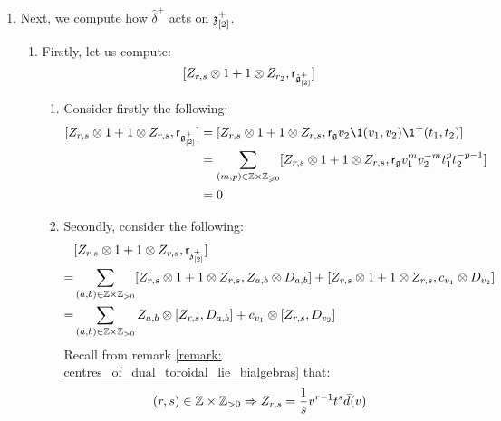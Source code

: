 \begin{remark}
\begin{enumerate}
                    \item Next, we compute how $\hat{\delta}^+$ acts on $\mathfrak{z}_{[2]}^+$. 
                    \begin{enumerate}
                        \item Firstly, let us compute:
                            $$[Z_{r, s} \tensor 1 + 1 \tensor Z_{r_2}, \sfr_{\hat{\g}_{[2]}^+}]$$
                        \begin{enumerate}
                            \item Consider firstly the following:
                                $$
                                    \begin{aligned}
                                        [Z_{r, s} \tensor 1 + 1 \tensor Z_{r, s}, \sfr_{\g_{[2]}^+}] & = [Z_{r, s} \tensor 1 + 1 \tensor Z_{r, s}, \sfr_{\g} v_2 \1(v_1, v_2) \1^+(t_1, t_2)]
                                        \\
                                        & = \sum_{(m, p) \in \Z \x \Z_{\geq 0}} [Z_{r, s} \tensor 1 + 1 \tensor Z_{r, s}, \sfr_{\g} v_1^m v_2^{-m} t_1^p t_2^{-p - 1}]
                                        \\
                                        & = 0
                                    \end{aligned}
                                $$
                            \item Secondly, consider the following:
                                $$
                                    \begin{aligned}
                                        & [Z_{r, s} \tensor 1 + 1 \tensor Z_{r, s}, \sfr_{\z_{[2]}^+}]
                                        \\
                                        = & \sum_{(a, b) \in \Z \x \Z_{> 0}} [Z_{r, s} \tensor 1 + 1 \tensor Z_{r, s}, Z_{a, b} \tensor D_{a, b}] + [Z_{r, s} \tensor 1 + 1 \tensor Z_{r, s}, c_{v_1} \tensor D_{v_2}]
                                        \\
                                        = & \sum_{(a, b) \in \Z \x \Z_{> 0}} Z_{a, b} \tensor [Z_{r, s}, D_{a, b}] + c_{v_1} \tensor [Z_{r, s}, D_{v_2}]
                                    \end{aligned}
                                $$
                            Recall from remark \ref{remark: centres_of_dual_toroidal_lie_bialgebras} that:
                                $$(r, s) \in \Z \x \Z_{> 0} \implies Z_{r, s} = \frac1s v^{r - 1} t^s \bar{d}(v)$$

\end{enumerate}
\end{enumerate}
\end{enumerate}
\end{remark}
